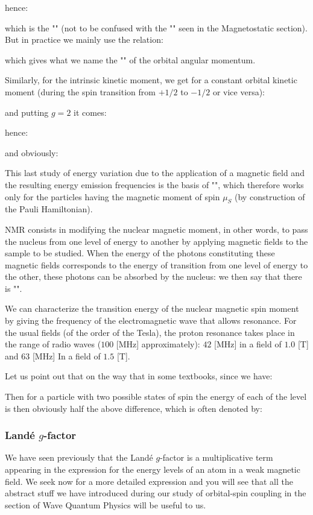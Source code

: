 	hence:
	
	which is the "" (not to be confused with the "" seen in the Magnetostatic section). But in practice we mainly use the relation:
	
	which gives what we name the "" of the orbital angular momentum.
	
	Similarly, for the intrinsic kinetic moment, we get for a constant orbital kinetic moment (during the spin transition from $+1/2$ to $-1/2$ or vice versa):
	
	and putting $g=2$ it comes:
	
	hence:
	
	and obviously:
	
	This last study of energy variation due to the application of a magnetic field and the resulting energy emission frequencies is the basis of "", which therefore works only for the particles having the magnetic moment of spin $\mu_S$ (by construction of the Pauli Hamiltonian).
	
	NMR consists in modifying the nuclear magnetic moment, in other words, to pass the nucleus from one level of energy to another by applying magnetic fields to the sample to be studied. When the energy of the photons constituting these magnetic fields corresponds to the energy of transition from one level of energy to the other, these photons can be absorbed by the nucleus: we then say that there is "".
	
	We can characterize the transition energy of the nuclear magnetic spin moment by giving the frequency of the electromagnetic wave that allows resonance. For the usual fields (of the order of the Tesla), the proton resonance takes place in the range of radio waves ($100$ [MHz] approximately): $42$ [MHz] in a field of $1.0$ [T] and $63$ [MHz] In a field of $1.5$ [T].
	
	Let us point out that on the way that in some textbooks, since we have:
	
	Then for a particle with two possible states of spin the energy of each of the level is then obviously half the above difference, which is often denoted by:
	
	
	\subsubsection{Landé $g$-factor}
	We have seen previously that the Landé $g$-factor is a multiplicative term appearing in the expression for the energy levels of an atom in a weak magnetic field. We seek now for a more detailed expression and you will see that all the abstract stuff we have introduced during our study of orbital-spin coupling in the section of Wave Quantum Physics will be useful to us.
	
